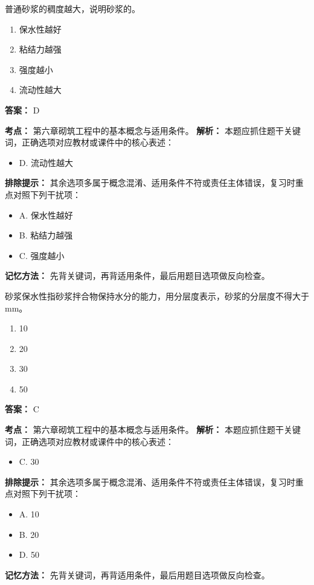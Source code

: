 \documentclass[UTF8,fontset=fandol,11pt]{ctexart}
\begin{document}
\vspace{0.2em}

\begin{quizbox}[title={第 4 题}]
普通砂浆的稠度越大，说明砂浆的。\\
\begin{enumerate}[label=\Alph*.]
\item 保水性越好
\item 粘结力越强
\item 强度越小
\item 流动性越大
\end{enumerate}
\textbf{答案：} D
\vspace{0.25em}
\begin{answerbox}[title={考点解析}]
\textbf{考点：} 第六章砌筑工程中的基本概念与适用条件。
\textbf{解析：} 本题应抓住题干关键词，正确选项对应教材或课件中的核心表述：
\begin{itemize}
\item D. 流动性越大
\end{itemize}
\textbf{排除提示：} 其余选项多属于概念混淆、适用条件不符或责任主体错误，复习时重点对照下列干扰项：
\begin{itemize}
\item A. 保水性越好
\item B. 粘结力越强
\item C. 强度越小
\end{itemize}
\textbf{记忆方法：} 先背关键词，再背适用条件，最后用题目选项做反向检查。
\end{answerbox}
\end{quizbox}

\vspace{0.2em}

\begin{quizbox}[title={第 5 题}]
砂浆保水性指砂浆拌合物保持水分的能力，用分层度表示，砂浆的分层度不得大于 mm。\\
\begin{enumerate}[label=\Alph*.]
\item 10
\item 20
\item 30
\item 50
\end{enumerate}
\textbf{答案：} C
\vspace{0.25em}
\begin{answerbox}[title={考点解析}]
\textbf{考点：} 第六章砌筑工程中的基本概念与适用条件。
\textbf{解析：} 本题应抓住题干关键词，正确选项对应教材或课件中的核心表述：
\begin{itemize}
\item C. 30
\end{itemize}
\textbf{排除提示：} 其余选项多属于概念混淆、适用条件不符或责任主体错误，复习时重点对照下列干扰项：
\begin{itemize}
\item A. 10
\item B. 20
\item D. 50
\end{itemize}
\textbf{记忆方法：} 先背关键词，再背适用条件，最后用题目选项做反向检查。
\end{answerbox}
\end{quizbox}
\end{document}
